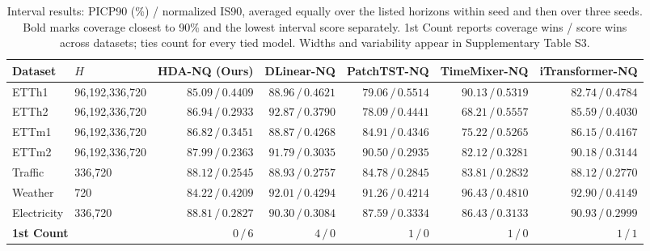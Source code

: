 \begin{table}[t]
\centering\small
\caption{Interval results: PICP90 (\%) / normalized IS90, averaged equally over the listed horizons within seed and then over three seeds. Bold marks coverage closest to 90\% and the lowest interval score separately. 1st Count reports coverage wins / score wins across datasets; ties count for every tied model. Widths and variability appear in Supplementary Table S3.}
\label{tab:external-intervals}
\begin{tabular*}{\textwidth}{@{\extracolsep{\fill}}llrrrrr@{}}
\toprule
Dataset & $H$ & HDA-NQ (Ours) & DLinear-NQ & PatchTST-NQ & TimeMixer-NQ & iTransformer-NQ \\
\midrule
ETTh1 & 96,192,336,720 & $85.09\,/\,\boldsymbol{0.4409}$ & $88.96\,/\,0.4621$ & $79.06\,/\,0.5514$ & $\boldsymbol{90.13}\,/\,0.5319$ & $82.74\,/\,0.4784$ \\
ETTh2 & 96,192,336,720 & $86.94\,/\,\boldsymbol{0.2933}$ & $\boldsymbol{92.87}\,/\,0.3790$ & $78.09\,/\,0.4441$ & $68.21\,/\,0.5557$ & $85.59\,/\,0.4030$ \\
ETTm1 & 96,192,336,720 & $86.82\,/\,\boldsymbol{0.3451}$ & $\boldsymbol{88.87}\,/\,0.4268$ & $84.91\,/\,0.4346$ & $75.22\,/\,0.5265$ & $86.15\,/\,0.4167$ \\
ETTm2 & 96,192,336,720 & $87.99\,/\,\boldsymbol{0.2363}$ & $91.79\,/\,0.3035$ & $90.50\,/\,0.2935$ & $82.12\,/\,0.3281$ & $\boldsymbol{90.18}\,/\,0.3144$ \\
Traffic & 336,720 & $88.12\,/\,\boldsymbol{0.2545}$ & $\boldsymbol{88.93}\,/\,0.2757$ & $84.78\,/\,0.2845$ & $83.81\,/\,0.2832$ & $88.12\,/\,0.2770$ \\
Weather & 720 & $84.22\,/\,0.4209$ & $92.01\,/\,0.4294$ & $\boldsymbol{91.26}\,/\,0.4214$ & $96.43\,/\,0.4810$ & $92.90\,/\,\boldsymbol{0.4149}$ \\
Electricity & 336,720 & $88.81\,/\,\boldsymbol{0.2827}$ & $\boldsymbol{90.30}\,/\,0.3084$ & $87.59\,/\,0.3334$ & $86.43\,/\,0.3133$ & $90.93\,/\,0.2999$ \\
\midrule
\multicolumn{2}{l}{\textbf{1st Count}} & $0\,/\,6$ & $4\,/\,0$ & $1\,/\,0$ & $1\,/\,0$ & $1\,/\,1$ \\
\bottomrule
\end{tabular*}
\end{table}
